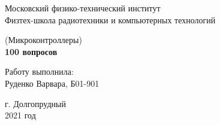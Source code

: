 \documentclass{article}
\begin{document}
	\begin{titlepage}
			\begin{center}
				\large 	Московский физико-технический институт \\
				Физтех-школа радиотехники и компьютерных технологий \\
				\vspace{0.2cm}
				
				\vspace{4.5cm}
				\large (Микроконтроллеры) \\ \vspace{0.2cm}
				\LARGE \textbf{100 вопросов}
			\end{center}
			\vspace{2.3cm} \large
			
			\begin{center}
				Работу выполнила: \\
				Руденко Варвара,
				Б01-901
				\vspace{10mm}		
				
			\end{center}
			
			\begin{center} \vspace{50mm}
				г. Долгопрудный \\
				2021 год
			\end{center}
		\end{titlepage}
		
\end{document}
